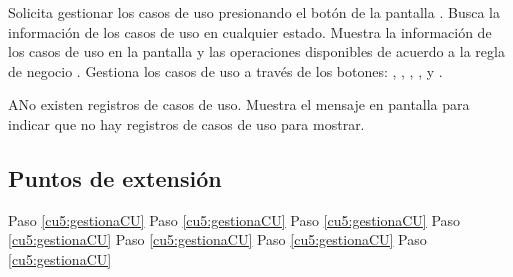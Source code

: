  \begin{UCtrayectoria}
    \UCpaso[\UCactor] Solicita gestionar los casos de uso presionando el botón \btnCU de la pantalla .
    \UCpaso[\UCsist] Busca la información de los casos de uso en cualquier estado. 
    \UCpaso[\UCsist] Muestra la información de los casos de uso en la pantalla  y las operaciones 
    disponibles de acuerdo a la regla de negocio . 
    \UCpaso[\UCactor] Gestiona los casos de uso a través de los botones: , \btnTray, \btnExt \btnConsulta, \btnEditar, \btnEliminar y \btnRevisar. \label{cu5:gestionaCU}
 \end{UCtrayectoria}
 
 \begin{UCtrayectoriaA}{A}{No existen registros de casos de uso.}
    \UCpaso[\UCsist] Muestra el mensaje  en pantalla  
    para indicar que no hay registros de casos de uso para mostrar.
 \end{UCtrayectoriaA}
 

\subsection{Puntos de extensión}

	{Paso \ref{cu5:gestionaCU}}
	{}
	{Paso \ref{cu5:gestionaCU}}
	{}
	{Paso \ref{cu5:gestionaCU}}
	{}
	{Paso \ref{cu5:gestionaCU}}
	{}	
	{Paso \ref{cu5:gestionaCU}}
	{}
	{Paso \ref{cu5:gestionaCU}}
	{}
	{Paso \ref{cu5:gestionaCU}}
	{}
  